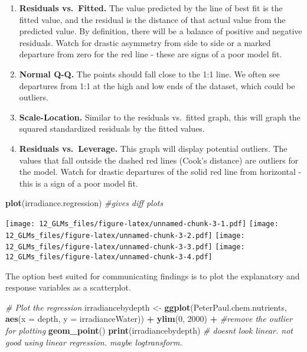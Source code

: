 \documentclass[]{article}
\newenvironment{Shaded}{\begin{snugshade}}{\end{snugshade}}
\newcommand{\KeywordTok}[1]{\textcolor[rgb]{0.13,0.29,0.53}{\textbf{#1}}}
\newcommand{\DataTypeTok}[1]{\textcolor[rgb]{0.13,0.29,0.53}{#1}}
\newcommand{\DecValTok}[1]{\textcolor[rgb]{0.00,0.00,0.81}{#1}}
\newcommand{\StringTok}[1]{\textcolor[rgb]{0.31,0.60,0.02}{#1}}
\newcommand{\CommentTok}[1]{\textcolor[rgb]{0.56,0.35,0.01}{\textit{#1}}}
\newcommand{\OperatorTok}[1]{\textcolor[rgb]{0.81,0.36,0.00}{\textbf{#1}}}
\newcommand{\NormalTok}[1]{#1}
\begin{document}
\begin{enumerate}
\def\labelenumi{\arabic{enumi}.}
\item
  \textbf{Residuals vs.~Fitted.} The value predicted by the line of best
  fit is the fitted value, and the residual is the distance of that
  actual value from the predicted value. By definition, there will be a
  balance of positive and negative residuals. Watch for drastic
  asymmetry from side to side or a marked departure from zero for the
  red line - these are signs of a poor model fit.
\item
  \textbf{Normal Q-Q.} The points should fall close to the 1:1 line. We
  often see departures from 1:1 at the high and low ends of the dataset,
  which could be outliers.
\item
  \textbf{Scale-Location.} Similar to the residuals vs.~fitted graph,
  this will graph the squared standardized residuals by the fitted
  values.
\item
  \textbf{Residuals vs.~Leverage.} This graph will display potential
  outliers. The values that fall outside the dashed red lines (Cook's
  distance) are outliers for the model. Watch for drastic departures of
  the solid red line from horizontal - this is a sign of a poor model
  fit.
\end{enumerate}

\begin{Shaded}
\begin{Highlighting}[]
\KeywordTok{plot}\NormalTok{(irradiance.regression) }\CommentTok{#gives diff plots}
\end{Highlighting}
\end{Shaded}

\texttt{[image: 12\_GLMs\_files/figure-latex/unnamed-chunk-3-1.pdf]}
\texttt{[image: 12\_GLMs\_files/figure-latex/unnamed-chunk-3-2.pdf]}
\texttt{[image: 12\_GLMs\_files/figure-latex/unnamed-chunk-3-3.pdf]}
\texttt{[image: 12\_GLMs\_files/figure-latex/unnamed-chunk-3-4.pdf]}

The option best suited for communicating findings is to plot the
explanatory and response variables as a scatterplot.

\begin{Shaded}
\begin{Highlighting}[]
\CommentTok{# Plot the regression}
\NormalTok{irradiancebydepth <-}\StringTok{ }
\StringTok{  }\KeywordTok{ggplot}\NormalTok{(PeterPaul.chem.nutrients, }\KeywordTok{aes}\NormalTok{(}\DataTypeTok{x =}\NormalTok{ depth, }\DataTypeTok{y =}\NormalTok{ irradianceWater)) }\OperatorTok{+}
\StringTok{  }\KeywordTok{ylim}\NormalTok{(}\DecValTok{0}\NormalTok{, }\DecValTok{2000}\NormalTok{) }\OperatorTok{+}\StringTok{ }\CommentTok{#remove the outlier for plotting}
\StringTok{  }\KeywordTok{geom_point}\NormalTok{() }
\KeywordTok{print}\NormalTok{(irradiancebydepth) }\CommentTok{# doesnt look linear. not good using linear regression. maybe logtransform.}
\end{Highlighting}
\end{Shaded}
\end{document}
